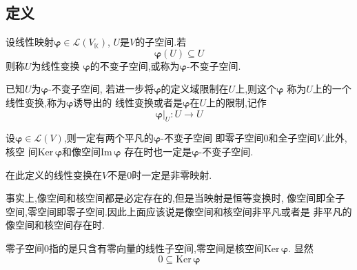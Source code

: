 \subsection{定义}
\begin{formal}
\begin{definition}[不变子空间]\label{def:不变子空间}
    设线性映射$\bm{\varphi}\in \mathcal{L}\left(V_{\mathbb{K}}\right)$,
    $U$是$V$的子空间.若
    \[
    \bm{\varphi}\left(U\right)\subseteq U
    \]
    则称$U$为线性变换
    $\bm{\varphi}
    $的不变子空间,或称为$\bm
    {\varphi}$-不变子空间.
\end{definition}
\end{formal}
\begin{formal}
\begin{definition}[线性变换的限制]\label{def:线性变换的限制}
    已知$U$为$\bm{\varphi}$-不变子空间,
    若进一步将$\bm{\varphi}$的定义域限制在$U$上,则这个$\bm{\varphi}$
    称为$U$上的一个线性变换,称为$\bm{\varphi}$诱导出的
    线性变换或者是$\bm{\varphi}$在$U$上的限制,记作
    \[
    \bm{\varphi}\Big |_U:U\longrightarrow U
    \]
\end{definition}
\end{formal}
\begin{brown}
\begin{example}
    设$\bm{\varphi}\in \mathcal{L}\left(V
    \right)$,则一定有两个平凡的$\bm{\varphi}$-不变子空间
    即零子空间$0$和全子空间$V$.此外,核空
    间$\mathrm{Ker}\,\bm{\varphi}$和像空间$\mathrm{Im}\,\bm{\varphi}$
    存在时也一定是$\bm{\varphi}$-不变子空间.
\end{example}
\end{brown}
\begin{red}
\begin{remark}
    在此定义的线性变换在$V$不是$0$时一定是非零映射.
\end{remark}
\end{red}
\begin{red}
\begin{remark}
    事实上,像空间和核空间都是必定存在的,但是当映射是恒等变换时,
    像空间即全子空间,零空间即零子空间.因此上面应该说是像空间和核空间非平凡或者是
    非平凡的像空间和核空间存在时.
\end{remark}
\end{red}
\begin{red}
\begin{remark}
    零子空间$0$指的是只含有零向量的线性子空间,零空间是核空间$\mathrm{Ker}\,\bm{\varphi}$.
显然\[
0\subseteq \mathrm{Ker}\,\bm{\varphi}
\]
\end{remark}
\end{red}
